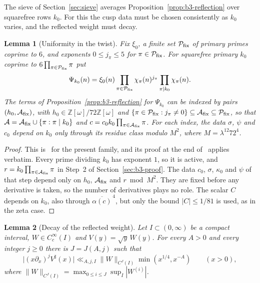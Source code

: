 \documentclass[11pt]{article}
\numberwithin{equation}{section}
\newcommand{\OO}{\mathbb Z[\omega]}
\newtheorem{lemma}{Lemma}
\begin{document}
The sieve of Section~\ref{sec:sieve} averages
Proposition~\ref{prop:b3-reflection} over squarefree rows $k_0$. For this
the cusp data must be chosen consistently as $k_0$ varies, and the
reflected weight must decay.

\begin{lemma}[Uniformity in the twist]\label{lem:b3-uniform}
Fix $\xi_0$, a finite set $\mathcal P_{\rm fix}$ of primary primes
coprime to $6$, and exponents $0\le j_\pi\le5$ for
$\pi\in\mathcal P_{\rm fix}$. For squarefree primary $k_0$ coprime to
$6\prod_{\pi\in\mathcal P_{\rm fix}}\pi$ put
\begin{equation}\label{eq:d100}
 \Psi_{k_0}(n)=\xi_0(n)\prod_{\pi\in\mathcal P_{\rm fix}}\chi_\pi(n)^{j_\pi}
 \prod_{\pi\mid k_0}\chi_\pi(n).
\end{equation}
The terms of Proposition~\ref{prop:b3-reflection} for $\Psi_{k_0}$ can
be indexed by pairs $(h_0,\mathcal A_{\rm fix})$, with $h_0\in\OO/72\OO$
and
$\{\pi\in\mathcal P_{\rm fix}:j_\pi\ne0\}\subseteq\mathcal A_{\rm fix}
\subseteq\mathcal P_{\rm fix}$, so that
$\mathcal A=\mathcal A_{\rm fix}\cup\{\pi:\pi\mid k_0\}$ and
$c=c_0k_0\prod_{\pi\in\mathcal A_{\rm fix}}\pi$. For each index, the
data $\sigma$, $\psi$ and $c_0$ depend on $k_0$ only through its residue
class modulo $M^2$, where $M=\lambda^{12}72^4$.
\end{lemma}

\begin{proof}
This is~\cite[Lemma~6.3]{OAI1112} for the present family, and its proof
at the end of~\cite[App.~A.2]{OAI1112} applies verbatim. Every prime
dividing $k_0$ has exponent $1$, so it is active, and
$r=k_0\prod_{\pi\in\mathcal A_{\rm fix}}\pi$ in Step~2 of
Section~\ref{sec:b3-proof}. The data $c_0$, $\sigma$, $\kappa_0$ and
$\psi$ of that step depend only on $h_0$, $\mathcal A_{\rm fix}$ and $r\bmod M^2$.
They are fixed before any derivative is taken, so the number of
derivatives plays no role. The scalar $C$ depends on $k_0$, also through
$\overline{\alpha(c)}^{\,4}$, but only the bound $|C|\le1/81$ is used,
as in the zeta case.
\end{proof}

\begin{lemma}[Decay of the reflected weight]\label{lem:b3-decay}
Let $I\subset(0,\infty)$ be a compact interval, $W\in C_c^\infty(I)$ and
$V(y)=\sqrt y\,W(y)$. For every $A>0$ and every integer $j\ge0$ there is
$J=J(A,j)$ such that
\begin{equation}\label{eq:d101}
 \bigl|(x\partial_x)^jV^\sharp(x)\bigr|
 \ll_{A,j,I}\|W\|_{C^J(I)}\min(x^{1/4},x^{-A})\qquad(x>0),
\end{equation}
where $\|W\|_{C^J(I)}=\max_{0\le i\le J}\sup_I|W^{(i)}|$.
\end{lemma}
\end{document}
